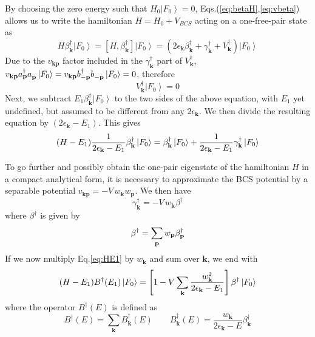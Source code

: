 \documentclass[aps,prb,superscriptaddress,showpacs,reprint,lengthcheck]{revtex4-1}
\newcommand{\vk}{\ensuremath{\mathbf{k}}}
\newcommand{\vp}{\ensuremath{\mathbf{p}}}
\begin{document}
By choosing the zero energy such
that $H_0\left|F_0\right> =0$, Eqs.(\ref{eq:betaH},\ref{eq:vbeta}) allows us to write the hamiltonian $H=H_0+V_{BCS}$
acting on a one-free-pair state as 
\begin{equation}
H\beta^{\dagger}_\vk\left|F_0\right>  =\left[H,\beta^{\dagger}_\vk\right] 
\left|F_0\right> 
=\left(2\epsilon_\vk\beta^{\dagger}_\vk+\gamma^{\dagger}_\vk+V^{\dagger}_\vk%
\right) \left|F_0\right>  
\end{equation}
Due to the $v_{\mathbf{k} \mathbf{p} }$ factor included
in the $\gamma^{\dagger}_{\mathbf{k} }$ part of $V^{\dagger}_\vk$, 
 $v_{\mathbf{k} \mathbf{p} }a^{\dagger}_{\mathbf{p} }a^{}_{%
\mathbf{p} }\left|F_0\right>=v_{\mathbf{k} \mathbf{p} }b^{\dagger}_{-\mathbf{p} }b^{}_{-\mathbf{p} }\left|F_0\right>=0$,
 therefore 
\begin{equation}\label{eq:Vk0}
V^{\dagger}_\vk\left|F_0\right> =0
\end{equation}
Next, we subtract $E _1\beta^{\dagger}_\vk\left|F_0\right>  $ to
the two sides of the above equation, with $E_1$ yet undefined, but assumed to be different from any $2\epsilon_{\mathbf{k}}$.  We then divide the resulting equation by $%
\left(2\epsilon_\vk-E _1\right) $.  This gives
\begin{equation}  \label{eq:HE1}
 (H-E_1)\frac{1}{2\epsilon_\vk-E _1} \beta^{\dagger}_\vk%
\left|F_0\right>  =\beta^{\dagger}_\vk\left|F_0\right>  +\frac{1}{%
2\epsilon_\vk-E _1} \gamma^{\dagger}_\vk\left|F_0\right>  
\end{equation}

To go further and possibly obtain the one-pair eigenstate of the hamiltonian $H$
in a compact analytical form, it is necessary to approximate the BCS potential by a separable potential $v_{\mathbf{k} \mathbf{p} }=-V\,w_\vk{}w_\vp$.
We then have  
\begin{equation}\gamma^{\dagger}_\vk=-V\,w_\vk\beta^{\dagger}
\end{equation} 
where $\beta^\dagger$ is given by
\begin{equation}  \label{eq:gammaBeta}
\beta^{\dagger}=\sum_%
\vp{}w_\vp\beta^{\dagger}_\vp
\end{equation}
If we  now multiply Eq.\eqref{eq:HE1} by $w_\vk$ and sum over $\mathbf{k} $,
we end with 
\begin{equation}\label{eq:1pair}
(H-E _1)B^{\dagger}(E _1)\left|F_0\right>  =\left[1-V\sum_\vk{%
\frac{w_\vk^2}{2\epsilon_\vk-E _1}}\right]
\beta^{\dagger}\left|F_0\right>  
\end{equation}
where the operator $B^{\dagger}(E)$ is defined as  
\begin{equation}  \label{eq:B}
B^{\dagger}(E)=\sum_\vk{B_\vk^{\dagger}(E)}\quad\quad B_\vk^{\dagger}(E)=\frac{w_\vk}{2\epsilon_\vk-E}\beta^{\dagger}_\vk
\end{equation}
\end{document}

